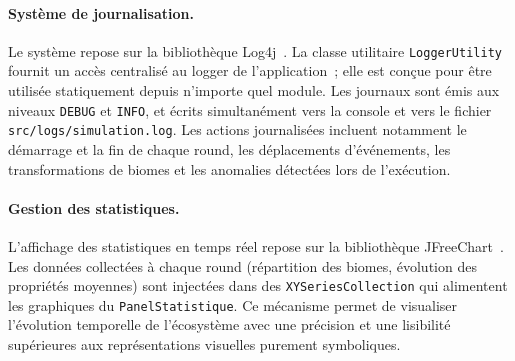 \paragraph{Système de journalisation.}
Le système repose sur la bibliothèque Log4j~\cite{apache_log4j}. La classe
utilitaire \texttt{LoggerUtility} fournit un accès centralisé au logger de
l'application~; elle est conçue pour être utilisée statiquement depuis n'importe
quel module. Les journaux sont émis aux niveaux \texttt{DEBUG} et \texttt{INFO},
et écrits simultanément vers la console et vers le fichier
\texttt{src/logs/simulation.log}. Les actions journalisées incluent notamment le
démarrage et la fin de chaque round, les déplacements d'événements, les
transformations de biomes et les anomalies détectées lors de l'exécution.

\paragraph{Gestion des statistiques.}
L'affichage des statistiques en temps réel repose sur la bibliothèque
JFreeChart~\cite{jfreechart}. Les données collectées à chaque round (répartition
des biomes, évolution des propriétés moyennes) sont injectées dans des
\texttt{XYSeriesCollection} qui alimentent les graphiques du
\texttt{PanelStatistique}. Ce mécanisme permet de visualiser l'évolution temporelle
de l'écosystème avec une précision et une lisibilité supérieures aux représentations
visuelles purement symboliques.
